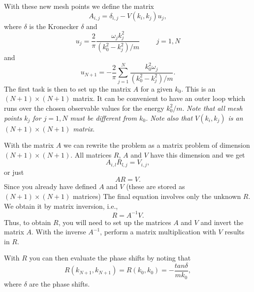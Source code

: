 \documentclass[graybox,sectrefs,envcountresetchap,open=right]{svmonodo}
\begin{document}
With these new mesh points we define the matrix
\begin{equation}
      A_{i,j}=\delta_{i,j}-V(k_i,k_j)u_j,
      \label{eq:aeq}
\end{equation}
where $\delta$ is the Kronecker $\delta$
and
\[
     u_j=\frac{2}{\pi}\frac{\omega_jk_j^2}{(k_0^2-k_j^2)/m}\hspace{1cm} j=1,N
\]
and
\[
     u_{N+1}=-\frac{2}{\pi}\sum_{j=1}^N\frac{k_0^2\omega_j}{(k_0^2-k_j^2)/m}.
\]
The first task is then to 
set up the matrix $A$ for a given $k_0$. This is an
$(N+1)\times (N+1)$ matrix. It can be convenient
to have an outer loop which runs over the chosen
observable values for the energy $k_0^2/m$.
{\em Note that all mesh points $k_j$ for $j=1,N$ must be
different from $k_0$. Note also that
$V(k_i,k_j)$ is an
$(N+1)\times (N+1)$ matrix}. 

With the matrix $A$ we can rewrite the problem as a matrix problem of dimension $(N+1)\times (N+1)$.
All matrices $R$, $A$ and $V$ have this dimension and we get
\[
    A_{i,l}R_{l,j}=V_{i,j},
\] 
or just
\[
    AR=V.
\] 
Since you already have defined $A$ and $V$
(these are stored as $(N+1)\times (N+1)$ matrices) 
The final equation involves only the unknown
$R$. We obtain it by matrix inversion, i.e.,
\begin{equation}
    R=A^{-1}V.
    \label{eq:final2}
\end{equation}
Thus, to obtain $R$, you will need to set up the matrices
$A$ and $V$ and invert the matrix $A$. 
With the inverse $A^{-1}$, perform
a matrix multiplication with $V$ results in $R$.

With $R$ you can then evaluate the phase shifts
by noting that 
\[
      R(k_{N+1},k_{N+1})=R(k_0,k_0)=-\frac{tan\delta}{mk_0},
\]
where $\delta$ are the phase shifts.
\end{document}
